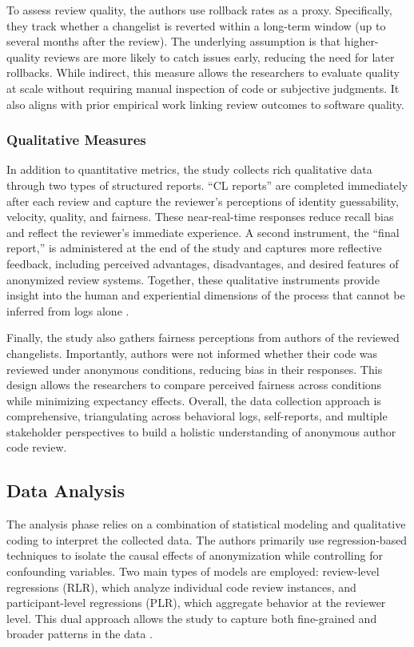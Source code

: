 To assess review quality, the authors use rollback rates as a proxy. Specifically, they track whether a changelist is reverted within a long-term window (up to several months after the review). The underlying assumption is that higher-quality reviews are more likely to catch issues early, reducing the need for later rollbacks. While indirect, this measure allows the researchers to evaluate quality at scale without requiring manual inspection of code or subjective judgments. It also aligns with prior empirical work linking review outcomes to software quality.

\subsubsection{Qualitative Measures}
In addition to quantitative metrics, the study collects rich qualitative data through two types of structured reports. “CL reports” are completed immediately after each review and capture the reviewer’s perceptions of identity guessability, velocity, quality, and fairness. These near-real-time responses reduce recall bias and reflect the reviewer’s immediate experience. A second instrument, the “final report,” is administered at the end of the study and captures more reflective feedback, including perceived advantages, disadvantages, and desired features of anonymized review systems. Together, these qualitative instruments provide insight into the human and experiential dimensions of the process that cannot be inferred from logs alone .

Finally, the study also gathers fairness perceptions from authors of the reviewed changelists. Importantly, authors were not informed whether their code was reviewed under anonymous conditions, reducing bias in their responses. This design allows the researchers to compare perceived fairness across conditions while minimizing expectancy effects. Overall, the data collection approach is comprehensive, triangulating across behavioral logs, self-reports, and multiple stakeholder perspectives to build a holistic understanding of anonymous author code review.

\subsection{Data Analysis}

The analysis phase relies on a combination of statistical modeling and qualitative coding to interpret the collected data. The authors primarily use regression-based techniques to isolate the causal effects of anonymization while controlling for confounding variables. Two main types of models are employed: review-level regressions (RLR), which analyze individual code review instances, and participant-level regressions (PLR), which aggregate behavior at the reviewer level. This dual approach allows the study to capture both fine-grained and broader patterns in the data .

